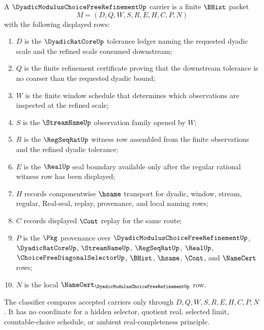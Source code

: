 \begin{definition}
\label{def:dyadic-modulus-choice-free-refinement-carrier}
A $\DyadicModulusChoiceFreeRefinementUp$ carrier is a finite $\BHist$ packet
$$
M=(D,Q,W,S,R,E,H,C,P,N)
$$
with the following displayed rows:
\begin{enumerate}
\item $D$ is the $\DyadicRatCoreUp$ tolerance ledger naming the requested dyadic scale and the refined scale consumed downstream;
\item $Q$ is the finite refinement certificate proving that the downstream tolerance is no coarser than the requested dyadic bound;
\item $W$ is the finite window schedule that determines which observations are inspected at the refined scale;
\item $S$ is the $\StreamNameUp$ observation family opened by $W$;
\item $R$ is the $\RegSeqRatUp$ witness row assembled from the finite observations and the refined dyadic tolerance;
\item $E$ is the $\RealUp$ seal boundary available only after the regular rational witness row has been displayed;
\item $H$ records componentwise $\hsame$ transport for dyadic, window, stream, regular, Real-seal, replay, provenance, and local naming rows;
\item $C$ records displayed $\Cont$ replay for the same route;
\item $P$ is the $\Pkg$ provenance over $\DyadicModulusChoiceFreeRefinementUp$, $\DyadicRatCoreUp$, $\StreamNameUp$, $\RegSeqRatUp$, $\RealUp$, $\ChoiceFreeDiagonalSelectorUp$, $\BHist$, $\hsame$, $\Cont$, and $\NameCert$ rows;
\item $N$ is the local $\NameCert_{\DyadicModulusChoiceFreeRefinementUp}$ row.
\end{enumerate}
The classifier compares accepted carriers only through $D,Q,W,S,R,E,H,C,P,N$. It has no coordinate for a hidden selector, quotient real, selected limit, countable-choice schedule, or ambient real-completeness principle.
\end{definition}

